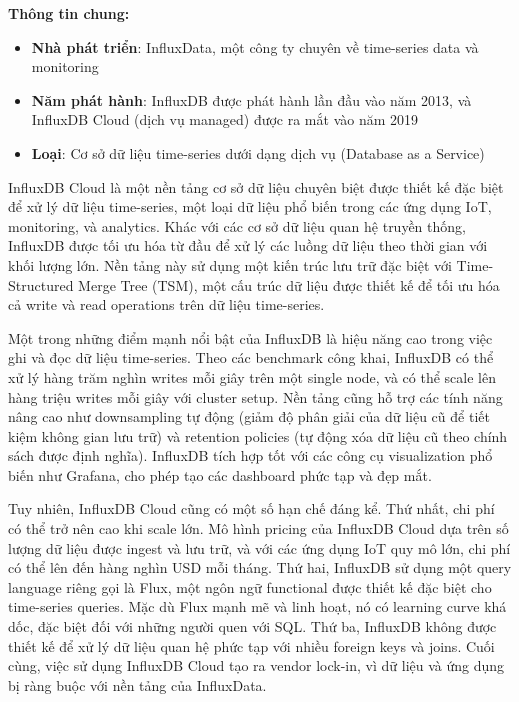 \textbf{Thông tin chung:}
\begin{itemize}
    \item \textbf{Nhà phát triển}: InfluxData, một công ty chuyên về time-series data và monitoring
    \item \textbf{Năm phát hành}: InfluxDB được phát hành lần đầu vào năm 2013, và InfluxDB Cloud (dịch vụ managed) được ra mắt vào năm 2019
    \item \textbf{Loại}: Cơ sở dữ liệu time-series dưới dạng dịch vụ (Database as a Service)
\end{itemize}

InfluxDB Cloud là một nền tảng cơ sở dữ liệu chuyên biệt được thiết kế đặc biệt để xử lý dữ liệu time-series, một loại dữ liệu phổ biến trong các ứng dụng IoT, monitoring, và analytics. Khác với các cơ sở dữ liệu quan hệ truyền thống, InfluxDB được tối ưu hóa từ đầu để xử lý các luồng dữ liệu theo thời gian với khối lượng lớn. Nền tảng này sử dụng một kiến trúc lưu trữ đặc biệt với Time-Structured Merge Tree (TSM), một cấu trúc dữ liệu được thiết kế để tối ưu hóa cả write và read operations trên dữ liệu time-series.

Một trong những điểm mạnh nổi bật của InfluxDB là hiệu năng cao trong việc ghi và đọc dữ liệu time-series. Theo các benchmark công khai, InfluxDB có thể xử lý hàng trăm nghìn writes mỗi giây trên một single node, và có thể scale lên hàng triệu writes mỗi giây với cluster setup. Nền tảng cũng hỗ trợ các tính năng nâng cao như downsampling tự động (giảm độ phân giải của dữ liệu cũ để tiết kiệm không gian lưu trữ) và retention policies (tự động xóa dữ liệu cũ theo chính sách được định nghĩa). InfluxDB tích hợp tốt với các công cụ visualization phổ biến như Grafana, cho phép tạo các dashboard phức tạp và đẹp mắt.

Tuy nhiên, InfluxDB Cloud cũng có một số hạn chế đáng kể. Thứ nhất, chi phí có thể trở nên cao khi scale lớn. Mô hình pricing của InfluxDB Cloud dựa trên số lượng dữ liệu được ingest và lưu trữ, và với các ứng dụng IoT quy mô lớn, chi phí có thể lên đến hàng nghìn USD mỗi tháng. Thứ hai, InfluxDB sử dụng một query language riêng gọi là Flux, một ngôn ngữ functional được thiết kế đặc biệt cho time-series queries. Mặc dù Flux mạnh mẽ và linh hoạt, nó có learning curve khá dốc, đặc biệt đối với những người quen với SQL. Thứ ba, InfluxDB không được thiết kế để xử lý dữ liệu quan hệ phức tạp với nhiều foreign keys và joins. Cuối cùng, việc sử dụng InfluxDB Cloud tạo ra vendor lock-in, vì dữ liệu và ứng dụng bị ràng buộc với nền tảng của InfluxData.

